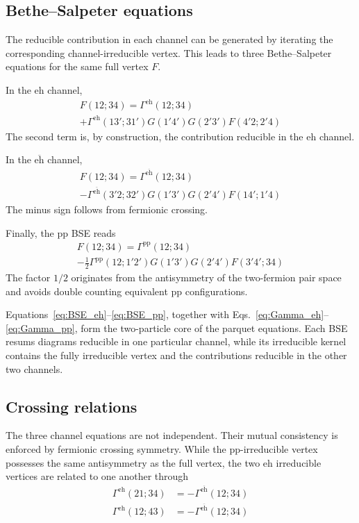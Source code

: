 \documentclass[aip,jcp,reprint,noshowkeys,superscriptaddress]{revtex4-1}
\newcommand{\eh}{\text{eh}}
\newcommand{\teh}{\overline{\text{eh}}}
\newcommand{\pp}{\text{pp}}
\begin{document}
\subsection{Bethe--Salpeter equations}

The reducible contribution in each channel can be generated by iterating
the corresponding channel-irreducible vertex.
This leads to three Bethe--Salpeter equations for the same full vertex
$F$.

In the $\eh$ channel,
\begin{multline}
	F(12;34)
	=
	\Gamma^\eh(12;34)
	\\
	+
	\Gamma^\eh(13';31')
	G(1'4')
	G(2'3')
	F(4'2;2'4)
	\label{eq:BSE_eh}
\end{multline}
The second term is, by construction, the contribution reducible in the $\eh$ channel.

In the $\teh$ channel,
\begin{multline}
	F(12;34)
	=
	\Gamma^{\teh}(12;34)
	\\
	-
	\Gamma^{\teh}(3'2;32')
	G(1'3')
	G(2'4')
	F(14';1'4)
	\label{eq:BSE_ehbar}
\end{multline}
The minus sign follows from fermionic crossing.


Finally, the $\pp$ BSE reads
\begin{multline}
	F(12;34)
	=
	\Gamma^\pp(12;34)
	\\
	-
	\frac{1}{2}
	\Gamma^\pp(12;1'2')
	G(1'3')
	G(2'4')
	F(3'4';34)
	\label{eq:BSE_pp}
\end{multline}
The factor $1/2$ originates from the antisymmetry of the two-fermion
pair space and avoids double counting equivalent $\pp$
configurations.

Equations~\eqref{eq:BSE_eh}--\eqref{eq:BSE_pp}, together with
Eqs.~\eqref{eq:Gamma_eh}--\eqref{eq:Gamma_pp}, form the two-particle
core of the parquet equations.
Each BSE resums diagrams reducible in one particular channel, while its
irreducible kernel contains the fully irreducible vertex and the
contributions reducible in the other two channels.

\subsection{Crossing relations}

The three channel equations are not independent.
Their mutual consistency is enforced by fermionic crossing symmetry.
While the $\pp$-irreducible vertex possesses the same antisymmetry as the
full vertex, the two $\eh$ irreducible vertices are related to
one another through
\begin{align}
	\Gamma^\eh(21;34)
	& =
	-
	\Gamma^{\teh}(12;34)
	\label{eq:Gamma_crossing_1}
	\\
	\Gamma^\eh(12;43)
	& =
	-
	\Gamma^{\teh}(12;34)
	\label{eq:Gamma_crossing_2}
\end{align}
\end{document}
